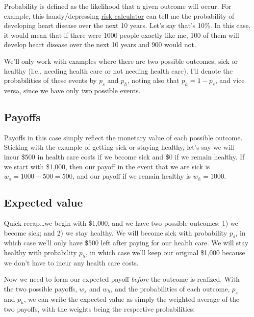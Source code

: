 \documentclass[
  letterpaper,
  DIV=11,
  numbers=noendperiod]{scrreport}
\theoremstyle{definition}
\theoremstyle{remark}
\begin{document}
Probability is defined as the likelihood that a given outcome will
occur. For example, this handy/depressing
\href{https://tools.acc.org/ascvd-risk-estimator-plus/\#!/calculate/estimate/}{risk
calculator} can tell me the probability of developing heart disease over
the next 10 years. Let's say that's 10\%. In this case, it would mean
that if there were 1000 people exactly like me, 100 of them will develop
heart disease over the next 10 years and 900 would not.

We'll only work with examples where there are two possible outcomes,
sick or healthy (i.e., needing health care or not needing health care).
I'll denote the probabilities of these events by \(p_{s}\) and
\(p_{h}\), noting also that \(p_{h}=1-p_{s}\), and vice versa, since we
have only two possible events.

\hypertarget{payoffs}{%
\subsection*{Payoffs}\label{payoffs}}

Payoffs in this case simply reflect the monetary value of each possible
outcome. Sticking with the example of getting sick or staying healthy,
let's say we will incur \$500 in health care costs if we become sick and
\$0 if we remain healthy. If we start with \$1,000, then our payoff in
the event that we are sick is \(w_{s}=1000-500=500\), and our payoff if
we remain healthy is \(w_{h}=1000\).

\hypertarget{expected-value}{%
\subsection*{Expected value}\label{expected-value}}

Quick recap\ldots we begin with \$1,000, and we have two possible
outcomes: 1) we become sick; and 2) we stay healthy. We will become sick
with probability \(p_{s}\), in which case we'll only have \$500 left
after paying for our health care. We will stay healthy with probability
\(p_{h}\), in which case we'll keep our original \$1,000 because we
don't have to incur any health care costs.

Now we need to form our expected payoff \emph{before} the outcome is
realized. With the two possible payoffs, \(w_{s}\) and \(w_{h}\), and
the probabilities of each outcome, \(p_{s}\) and \(p_{h}\), we can write
the expected value as simply the weighted average of the two payoffs,
with the weights being the respective probabilities:
\end{document}
